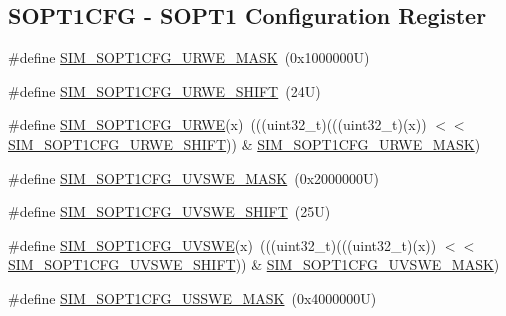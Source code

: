 \subsection*{S\+O\+P\+T1\+C\+FG -\/ S\+O\+P\+T1 Configuration Register}
\begin{DoxyCompactItemize}
\item 
\#define \mbox{\hyperlink{group___s_i_m___register___masks_gaa4e1ee8f60c8c15ad553c2dfb82c2039}{S\+I\+M\+\_\+\+S\+O\+P\+T1\+C\+F\+G\+\_\+\+U\+R\+W\+E\+\_\+\+M\+A\+SK}}~(0x1000000\+U)
\item 
\#define \mbox{\hyperlink{group___s_i_m___register___masks_ga07bf2ffc61aacca96748747fa8df7062}{S\+I\+M\+\_\+\+S\+O\+P\+T1\+C\+F\+G\+\_\+\+U\+R\+W\+E\+\_\+\+S\+H\+I\+FT}}~(24\+U)
\item 
\#define \mbox{\hyperlink{group___s_i_m___register___masks_gab35f1f0507a59aa7b67b63ab7550bbca}{S\+I\+M\+\_\+\+S\+O\+P\+T1\+C\+F\+G\+\_\+\+U\+R\+WE}}(x)~(((uint32\+\_\+t)(((uint32\+\_\+t)(x)) $<$$<$ \mbox{\hyperlink{group___s_i_m___register___masks_ga07bf2ffc61aacca96748747fa8df7062}{S\+I\+M\+\_\+\+S\+O\+P\+T1\+C\+F\+G\+\_\+\+U\+R\+W\+E\+\_\+\+S\+H\+I\+FT}})) \& \mbox{\hyperlink{group___s_i_m___register___masks_gaa4e1ee8f60c8c15ad553c2dfb82c2039}{S\+I\+M\+\_\+\+S\+O\+P\+T1\+C\+F\+G\+\_\+\+U\+R\+W\+E\+\_\+\+M\+A\+SK}})
\item 
\#define \mbox{\hyperlink{group___s_i_m___register___masks_ga29e593e134a31bed2dbd3673c51cb330}{S\+I\+M\+\_\+\+S\+O\+P\+T1\+C\+F\+G\+\_\+\+U\+V\+S\+W\+E\+\_\+\+M\+A\+SK}}~(0x2000000\+U)
\item 
\#define \mbox{\hyperlink{group___s_i_m___register___masks_ga74d94a9794e03091f54b76a5c18c58b8}{S\+I\+M\+\_\+\+S\+O\+P\+T1\+C\+F\+G\+\_\+\+U\+V\+S\+W\+E\+\_\+\+S\+H\+I\+FT}}~(25\+U)
\item 
\#define \mbox{\hyperlink{group___s_i_m___register___masks_ga0889129046535e3511d47d7a806b8644}{S\+I\+M\+\_\+\+S\+O\+P\+T1\+C\+F\+G\+\_\+\+U\+V\+S\+WE}}(x)~(((uint32\+\_\+t)(((uint32\+\_\+t)(x)) $<$$<$ \mbox{\hyperlink{group___s_i_m___register___masks_ga74d94a9794e03091f54b76a5c18c58b8}{S\+I\+M\+\_\+\+S\+O\+P\+T1\+C\+F\+G\+\_\+\+U\+V\+S\+W\+E\+\_\+\+S\+H\+I\+FT}})) \& \mbox{\hyperlink{group___s_i_m___register___masks_ga29e593e134a31bed2dbd3673c51cb330}{S\+I\+M\+\_\+\+S\+O\+P\+T1\+C\+F\+G\+\_\+\+U\+V\+S\+W\+E\+\_\+\+M\+A\+SK}})
\item 
\#define \mbox{\hyperlink{group___s_i_m___register___masks_ga0b7d9fe471d5d689ba3feb001cf69b60}{S\+I\+M\+\_\+\+S\+O\+P\+T1\+C\+F\+G\+\_\+\+U\+S\+S\+W\+E\+\_\+\+M\+A\+SK}}~(0x4000000\+U)
\item 

\end{DoxyCompactItemize}
